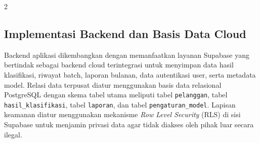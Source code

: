 \documentclass[12pt, a4paper, onecolumn, oneside]{report}
\begin{document}
\begin{spacing}{2}
\subsection{Implementasi Backend dan Basis Data Cloud}
Backend aplikasi dikembangkan dengan memanfaatkan layanan Supabase yang bertindak sebagai backend cloud terintegrasi untuk menyimpan data hasil klasifikasi, riwayat batch, laporan bulanan, data autentikasi user, serta metadata model. Relasi data terpusat diatur menggunakan basis data relasional PostgreSQL dengan skema tabel utama meliputi tabel \texttt{pelanggan}, tabel \texttt{hasil\_klasifikasi}, tabel \texttt{laporan}, dan tabel \texttt{pengaturan\_model}. Lapisan keamanan diatur menggunakan mekanisme \textit{Row Level Security} (RLS) di sisi Supabase untuk menjamin privasi data agar tidak diakses oleh pihak luar secara ilegal.


\end{spacing}
\end{document}
